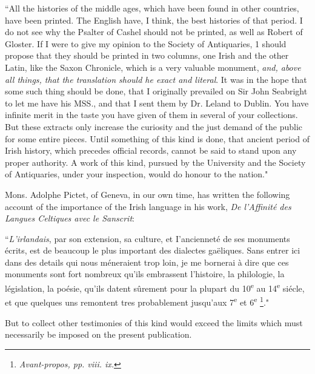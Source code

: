 \documentclass[11pt,oneside]{memoir}
\begin{document}
``All the histories of the middle ages, which have been found in other countries, have been printed.
The English have, I think, the best histories of that period.
I do not see why the Psalter of Cashel should not be printed, as well as Robert of Gloster.
If I were to give my opinion to the Society of Antiquaries, 1 should propose that they should be printed in two columns, one Irish and the other Latin, like the Saxon Chronicle, which is a very valuable monument, \textit{and, above all things, that the translation should he exact and literal}.
It was in the hope that some such thing should be done, that I originally prevailed on Sir John Seabright to let me have his MSS., and that I sent them by Dr. Leland to Dublin.
You have infinite merit in the taste you have given of them in several of your collections.
But these extracts only increase the curiosity and the just demand of the public for some entire pieces.
Until something of this kind is done, that ancient period of Irish history, which precedes official records, cannot be said to stand upon any proper authority.
A work of this kind, pursued by the University and the Society of Antiquaries, under your inspection, would do honour to the nation." 

Mons. Adolphe Pictet, of Geneva, in our own time, has written the following account of the importance of the Irish language in his work, \textit{De l'Affinité des Langues Celtiques avec le Sanscrit}:

``\textit{L'irlandais}, par son extension, sa culture, et I'ancienneté de ses monuments écrits, est de beaucoup le plus important des dialectes gaëliques.
Sans entrer ici dans des details qui nous méneraient trop loin, je me bornerai à dire que ces monuments sont fort nombreux qu'ils embrassent l'histoire, la philologie, la législation, la poésie, qu'ils datent sûrement pour la plupart du 10\textsuperscript{e} au 14\textsuperscript{e} siécle, et que quelques uns remontent tres probablement jusqu'aux 7\textsuperscript{e} et 6\textsuperscript{e} \footnote{
    \textit{Avant-propos, pp. viii. ix.}
}." 

But to collect other testimonies of this kind would exceed the limits which must necessarily be imposed on the present publication.
\end{document}
